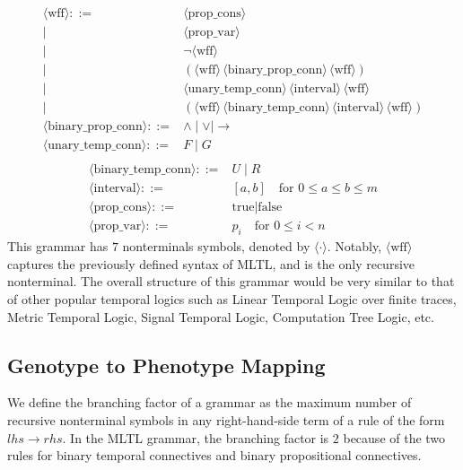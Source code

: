 \documentclass[runningheads]{llncs}
\begin{document}
\begin{align*}
    \langle \text{wff} \rangle ::={} & \langle \text{prop\_cons} \rangle \\
    \mid & \langle \text{prop\_var} \rangle \\
    \mid & \lnot \langle \text{wff} \rangle \\
    \mid & ( \langle \text{wff} \rangle \, \langle \text{binary\_prop\_conn} \rangle \, \langle \text{wff} \rangle ) \\
    \mid & \langle \text{unary\_temp\_conn} \rangle \, \langle \text{interval} \rangle \, \langle \text{wff} \rangle \\
    \mid & ( \langle \text{wff} \rangle \, \langle \text{binary\_temp\_conn} \rangle \, \langle \text{interval} \rangle \, \langle \text{wff} \rangle ) \\
    \langle \text{binary\_prop\_conn} \rangle ::={} & \land \mid \lor \mid \rightarrow \\
    \langle \text{unary\_temp\_conn} \rangle ::={} & F \mid G \\
\end{align*}
\begin{align*}
    \langle \text{binary\_temp\_conn} \rangle ::={} & U \mid R \\
    \langle \text{interval} \rangle ::={} & [a, b] \quad \text{for } 0 \leq a \leq b \leq m \\
    \langle \text{prop\_cons} \rangle ::={} & \text{true} \mid \text{false} \\
    \langle \text{prop\_var} \rangle ::={} & p_i \quad \text{for } 0 \leq i < n
\end{align*}
This grammar has $7$ nonterminals symbols, denoted by $\langle \cdot \rangle$. 
Notably, $\langle \text{wff} \rangle$ captures the previously defined syntax of MLTL, and is the only recursive nonterminal. 
The overall structure of this grammar would be very similar to that of other popular temporal logics such as Linear Temporal Logic over finite traces, Metric Temporal Logic, Signal Temporal Logic, Computation Tree Logic, etc. 

\subsection{Genotype to Phenotype Mapping}
We define the branching factor of a grammar as the maximum number of recursive nonterminal symbols in any right-hand-side term of a rule of the form $lhs \rightarrow rhs$. In the MLTL grammar, the branching factor is $2$ because of the two rules for binary temporal connectives and binary propositional connectives.
\end{document}
